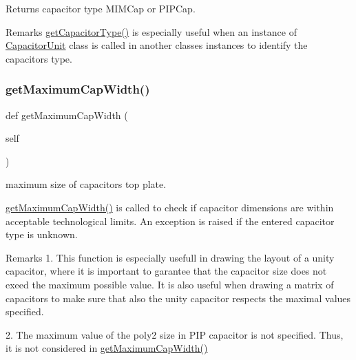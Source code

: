 \begin{DoxyReturn}{Returns}
capacitor type {\ttfamily \textquotesingle{}M\+I\+M\+Cap\textquotesingle{}} or {\ttfamily \textquotesingle{}P\+I\+P\+Cap\textquotesingle{}}. 
\end{DoxyReturn}
\begin{DoxyRemark}{Remarks}
{\ttfamily \mbox{\hyperlink{classpython_1_1capacitorunit_1_1CapacitorUnit_a826bc534525cb9da119bf5e53393c4e8}{get\+Capacitor\+Type()}}} is especially useful when an instance of {\ttfamily \mbox{\hyperlink{classpython_1_1capacitorunit_1_1CapacitorUnit}{Capacitor\+Unit}}} class is called in another classes instances to identify the capacitor\textquotesingle{}s type. 
\end{DoxyRemark}
\mbox{\label{classpython_1_1capacitorunit_1_1CapacitorUnit_a11bb732ab03e3d6b3fb8b4e3b109c983}} 
\subsubsection{\texorpdfstring{get\+Maximum\+Cap\+Width()}{getMaximumCapWidth()}}
{\footnotesize\ttfamily def get\+Maximum\+Cap\+Width (\begin{DoxyParamCaption}\item[{}]{self }\end{DoxyParamCaption})}



maximum size of capacitor\textquotesingle{}s top plate. 

{\ttfamily \mbox{\hyperlink{classpython_1_1capacitorunit_1_1CapacitorUnit_a11bb732ab03e3d6b3fb8b4e3b109c983}{get\+Maximum\+Cap\+Width()}}} is called to check if capacitor dimensions are within acceptable technological limits. An exception is raised if the entered capacitor type is unknown. \begin{DoxyRemark}{Remarks}
1. This function is especially usefull in drawing the layout of a unity capacitor, where it is important to garantee that the capacitor size does not exeed the maximum possible value. It is also useful when drawing a matrix of capacitors to make sure that also the unity capacitor respects the maximal values specified. 

2. The maximum value of the poly2 size in P\+IP capacitor is not specified. Thus, it is not considered in {\ttfamily \mbox{\hyperlink{classpython_1_1capacitorunit_1_1CapacitorUnit_a11bb732ab03e3d6b3fb8b4e3b109c983}{get\+Maximum\+Cap\+Width()}}} 
\end{DoxyRemark}


